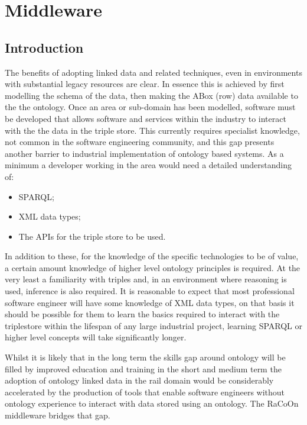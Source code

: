 \chapter{Middleware}\label{ch:middleware}
\section{Introduction}\label{sec:mwintro}
The benefits of adopting linked data and related techniques, even in environments with substantial legacy resources are clear. In essence this is achieved by first modelling the schema of the data, then making the ABox (row) data available to the the ontology. Once an area or sub-domain has been modelled, software must be developed that allows software and services within the industry to interact with the the data in the triple store. This currently requires specialist knowledge, not common in the software engineering community, and this gap presents another barrier to industrial implementation of ontology based systems. As a minimum a developer working in the area would need a detailed understanding of:
\begin{itemize}
    \item SPARQL;
    \item XML data types;
    \item The APIs for the triple store to be used.
\end{itemize}

In addition to these, for the knowledge of the specific technologies to be of value, a certain amount knowledge of higher level ontology principles is required. At the very least a familiarity with triples and, in an environment where reasoning is used, inference is also required. It is reasonable to expect that most professional software engineer will have some knowledge of XML data types, on that basis it should be possible for them to learn the basics required to interact with the triplestore within the lifespan of any large industrial project, learning SPARQL or higher level concepts will take significantly longer.

Whilst it is likely that in the long term the skills gap around ontology will be filled by improved education and training in the short and medium term the adoption of ontology linked data in the rail domain would be considerably accelerated by the production of tools that enable software engineers without ontology experience to interact with data stored using an ontology. The RaCoOn middleware bridges that gap.

